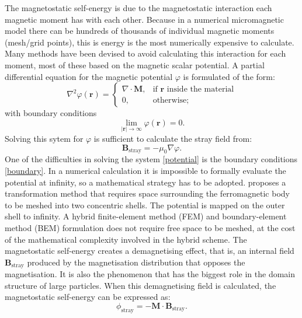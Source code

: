 The magnetostatic self-energy is due to the magnetostatic interaction each magnetic moment has with each other. Because in a numerical micromagnetic model there can be hundreds of thousands of individual magnetic moments (mesh/grid points), this is energy is the most numerically expensive to calculate. Many methods have been devised to avoid calculating this interaction for each moment, most of these based on the magnetic scalar potential. A partial differential equation for the magnetic potential $\varphi$ is formulated of the form:
\begin{equation}\label{potential}
\nabla^2 \varphi(\boldsymbol{r}) =
\begin{cases}
\nabla \cdot \boldsymbol{M}, & \text{if }\boldsymbol{r} \text{ inside the material} \\
0,                           & \text{otherwise;}
\end{cases}
\end{equation}
with boundary conditions
\begin{equation}\label{boundary}
\lim_{|\boldsymbol{r}| \to \infty} \varphi(\boldsymbol{r}) = 0.
\end{equation}
Solving this sytem for $\varphi$ is sufficient to calculate the stray field from:
\begin{equation}
\boldsymbol{B}_\text{stray} = -\mu_0 \nabla \varphi.
\end{equation}
One of the difficulties in solving the system \ref{potential} is the boundary conditions \ref{boundary}. In a numerical calculation it is impossible to formally evaluate the potential at infinity, so a mathematical strategy has to be adopted. \citet{Imhoff1990} proposes a transformation method that requires space surrounding the ferromagnetic body to be meshed into two concentric shells. The potential is mapped on the outer shell to infinity. A hybrid finite-element method (FEM) and boundary-element method (BEM) formulation \citep{Fredkin1990} does not require free space to be meshed, at the cost of the mathematical complexity involved in the hybrid scheme. The magnetostatic self-energy creates a demagnetising effect, that is, an internal field $\boldsymbol{B}_{\text{stray}}$ produced by the magnetisation distribution that opposes the magnetisation. It is also the phenomenon that has the biggest role in the domain structure of large particles. When this demagnetising field is calculated, the magnetostatic self-energy can be expressed as:
\begin{equation}
\phi_{\text{stray}} = -\boldsymbol{M}\cdot\boldsymbol{B}_{\text{stray}}.
\end{equation}\par

